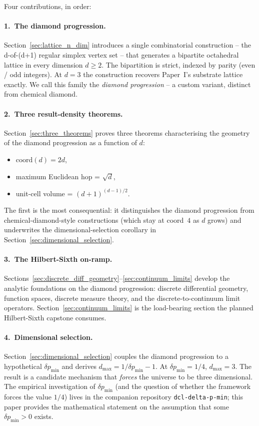 Four contributions, in order:

\paragraph{1.~The diamond progression.}
Section~\ref{sec:lattice_n_dim} introduces a single combinatorial
construction -- the d-of-(d+1) regular simplex vertex set -- that
generates a bipartite octahedral lattice in every dimension
$d \geq 2$.  The bipartition is strict, indexed by parity (even /
odd integers).  At $d = 3$ the construction recovers Paper~I's
substrate lattice exactly.  We call this family the \emph{diamond
progression} -- a custom variant, distinct from chemical diamond.

\paragraph{2.~Three result-density theorems.}
Section~\ref{sec:three_theorems} proves three theorems
characterising the geometry of the diamond progression as a
function of $d$:

\begin{itemize}
\item $\text{coord}(d) = 2d$,
\item maximum Euclidean hop = $\sqrt{d}$,
\item unit-cell volume = $(d+1)^{(d-1)/2}$.
\end{itemize}
The first is the most consequential: it distinguishes the diamond
progression from chemical-diamond-style constructions (which stay at
coord~$4$ as $d$ grows) and underwrites the dimensional-selection
corollary in Section~\ref{sec:dimensional_selection}.

\paragraph{3.~The Hilbert-Sixth on-ramp.}
Sections~\ref{sec:discrete_diff_geometry}--\ref{sec:continuum_limits}
develop the analytic foundations on the diamond progression:
discrete differential geometry, function spaces, discrete measure
theory, and the discrete-to-continuum limit operators.  Section~\ref{sec:continuum_limits}
is the load-bearing section the planned Hilbert-Sixth capstone
consumes.

\paragraph{4.~Dimensional selection.}
Section~\ref{sec:dimensional_selection} couples the diamond
progression to a hypothetical $\delta p_\min$ and derives
$d_{\max} = 1/\delta p_\min - 1$.  At $\delta p_\min = 1/4$,
$d_{\max} = 3$.  The result is a candidate mechanism that
\emph{forces} the universe to be three dimensional.  The empirical
investigation of $\delta p_\min$ (and the question of whether the
framework forces the value $1/4$) lives in the companion repository
\texttt{dcl-delta-p-min}; this paper provides the mathematical
statement on the assumption that some $\delta p_\min > 0$ exists.

